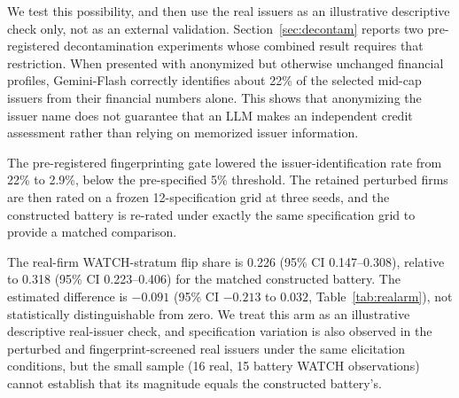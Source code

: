 \documentclass[a4paper,fleqn]{cas-sc}
\begin{document}
We test this possibility, and then use the real issuers as an illustrative descriptive
check only, not as an external validation. Section~\ref{sec:decontam} reports two pre-registered
decontamination experiments whose combined result requires that restriction. When presented with
anonymized but otherwise unchanged financial profiles, Gemini-Flash correctly identifies about 22\% of
the selected mid-cap issuers from their financial numbers alone. This shows that anonymizing the issuer
name does not guarantee that an LLM makes an independent credit assessment rather than relying on
memorized issuer information.

The pre-registered fingerprinting gate lowered the issuer-identification rate from 22\% to 2.9\%, below
the pre-specified 5\% threshold. The retained perturbed firms are then rated on a frozen 12-specification grid
at three seeds, and the constructed battery is re-rated under exactly the same specification grid to
provide a matched comparison.

The real-firm WATCH-stratum flip share is 0.226 (95\% CI 0.147--0.308), relative to 0.318 (95\% CI
0.223--0.406) for the matched constructed battery. The estimated difference is $-0.091$ (95\% CI $-0.213$
to $0.032$, Table~\ref{tab:realarm}), not statistically distinguishable from zero. We treat this arm as an
illustrative descriptive real-issuer check, and specification variation is also observed
in the perturbed and fingerprint-screened real issuers under the same elicitation conditions, but the small sample (16 real, 15
battery WATCH observations) cannot establish that its magnitude equals the constructed battery's.
\end{document}
